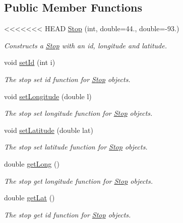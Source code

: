 \begin{figure}[H]
\begin{center}
\subsection*{Public Member Functions}
\begin{DoxyCompactItemize}
\item 
<<<<<<< HEAD
\hyperlink{classStop_a59d881f072b1cf89512bb15a51ffc773}{Stop} (int, double=44., double=-\/93.)
\begin{DoxyCompactList}\small\item\em Constructs a \hyperlink{classStop}{Stop} with an id, longitude and latitude. \end{DoxyCompactList}\item 
void \hyperlink{classStop_a936324668d7b9f5edfbe4531cf244608}{set\+Id} (int i)
\begin{DoxyCompactList}\small\item\em The stop set id function for \hyperlink{classStop}{Stop} objects. \end{DoxyCompactList}\item 
void \hyperlink{classStop_a26866e7dfd469467c67d4176693b53c7}{set\+Longitude} (double l)
\begin{DoxyCompactList}\small\item\em The stop set longitude function for \hyperlink{classStop}{Stop} objects. \end{DoxyCompactList}\item 
void \hyperlink{classStop_ad70323088d687724e6eaad1eb723061f}{set\+Latitude} (double lat)
\begin{DoxyCompactList}\small\item\em The stop set latitude function for \hyperlink{classStop}{Stop} objects. \end{DoxyCompactList}\item 
double \hyperlink{classStop_aea4bfbf489a3a61ecb104e9aa9f613c4}{get\+Long} ()
\begin{DoxyCompactList}\small\item\em The stop get longitude function for \hyperlink{classStop}{Stop} objects. \end{DoxyCompactList}\item 
double \hyperlink{classStop_ad26553052a5ee0c478f4988ec51236d9}{get\+Lat} ()
\begin{DoxyCompactList}\small\item\em The stop get id function for \hyperlink{classStop}{Stop} objects. \end{DoxyCompactList}\item 

\end{DoxyCompactItemize}
\end{center}
\end{figure}
